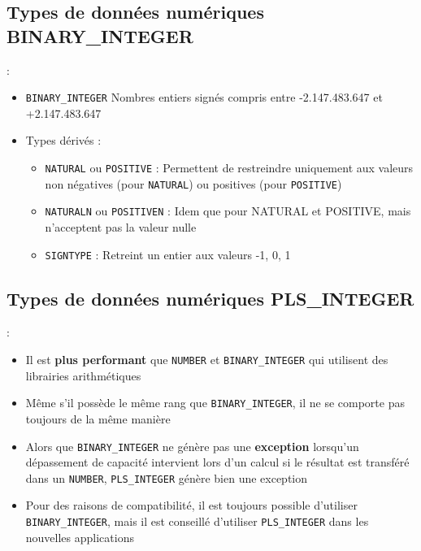 \documentclass[10pt]{beamer}
\begin{document}
\subsection{Types de données numériques BINARY\_INTEGER}
\begin{frame}{\secname : \subsecname}
    \begin{itemize}
        \item \lstinline[language=plsql]!BINARY_INTEGER! Nombres entiers signés compris entre -2.147.483.647 et +2.147.483.647
        \item Types dérivés :
              \begin{itemize}
                  \item \lstinline[language=plsql]!NATURAL! ou \lstinline[language=plsql]!POSITIVE! : Permettent de restreindre uniquement aux valeurs non négatives (pour \lstinline[language=plsql]!NATURAL!) ou positives (pour \lstinline[language=plsql]!POSITIVE!)
                  \item \lstinline[language=plsql]!NATURALN! ou \lstinline[language=plsql]!POSITIVEN! : Idem que pour NATURAL et POSITIVE, mais n'acceptent pas la valeur nulle
                  \item \lstinline[language=plsql]!SIGNTYPE! : Retreint un entier aux valeurs -1, 0, 1
              \end{itemize}
    \end{itemize}
\end{frame}

\subsection{Types de données numériques PLS\_INTEGER}
\begin{frame}{\secname : \subsecname}
    \begin{itemize}
        \item Il est \textbf{plus performant} que \lstinline[language=plsql]!NUMBER! et \lstinline[language=plsql]!BINARY_INTEGER! qui utilisent des librairies arithmétiques
        \item Même s'il possède le même rang que \lstinline[language=plsql]!BINARY_INTEGER!, il ne se comporte pas toujours de la même manière
        \item Alors que \lstinline[language=plsql]!BINARY_INTEGER! ne génère pas une \textbf{exception} lorsqu'un dépassement de capacité intervient lors d'un calcul si le résultat est transféré dans un \lstinline[language=plsql]!NUMBER!, \lstinline[language=plsql]!PLS_INTEGER! génère bien une exception
        \item Pour des raisons de compatibilité, il est toujours possible d'utiliser \lstinline[language=plsql]!BINARY_INTEGER!, mais il est conseillé d'utiliser \lstinline[language=plsql]!PLS_INTEGER! dans les nouvelles applications

    \end{itemize}
\end{frame}
\end{document}
